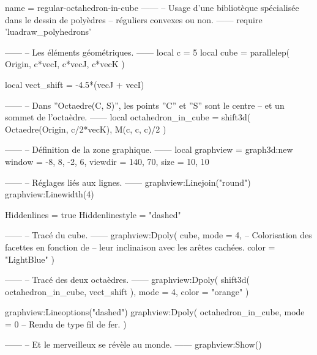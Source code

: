 \documentclass[border = 3pt]{standalone}
\begin{document}
\begin{luadraw}{name = regular-octahedron-in-cube}
------
-- Usage d'une bibliotèque spécialisée dans le dessin de polyèdres
-- réguliers convexes ou non.
------
require 'luadraw_polyhedrons'

------
-- Les éléments géométriques.
------
local c = 5
local cube = parallelep(
  Origin,
  c*vecI, c*vecJ, c*vecK
)

local vect_shift = -4.5*(vecJ + vecI)

------
-- Dans ''Octaedre(C, S)'', les points ''C'' et ''S'' sont le centre
-- et un sommet de l'octaèdre.
------
local octahedron_in_cube = shift3d(
  Octaedre(Origin, c/2*vecK),
  M(c, c, c)/2
)

------
-- Définition de la zone graphique.
------
local graphview = graph3d:new{
  window  = {-8, 8, -2, 6},
  viewdir = {140, 70},
  size    = {10, 10}
}

------
-- Réglages liés aux lignes.
------
graphview:Linejoin("round")
graphview:Linewidth(4)

Hiddenlines     = true
Hiddenlinestyle = "dashed"

------
-- Tracé du cube.
------
graphview:Dpoly(
  cube,
  {
    mode  = 4,  -- Colorisation des facettes en fonction de
                -- leur inclinaison avec les arêtes cachées.
    color = "LightBlue"
  })

------
-- Tracé des deux octaèdres.
------
graphview:Dpoly(
  shift3d(
    octahedron_in_cube,
    vect_shift
  ),
  {
    mode = 4,
    color = "orange"
  })

graphview:Lineoptions("dashed")
graphview:Dpoly(
  octahedron_in_cube,
  {
    mode = 0  -- Rendu de type fil de fer.
  })

------
-- Et le merveilleux se révèle au monde.
------
graphview:Show()
\end{luadraw}
\end{document}
